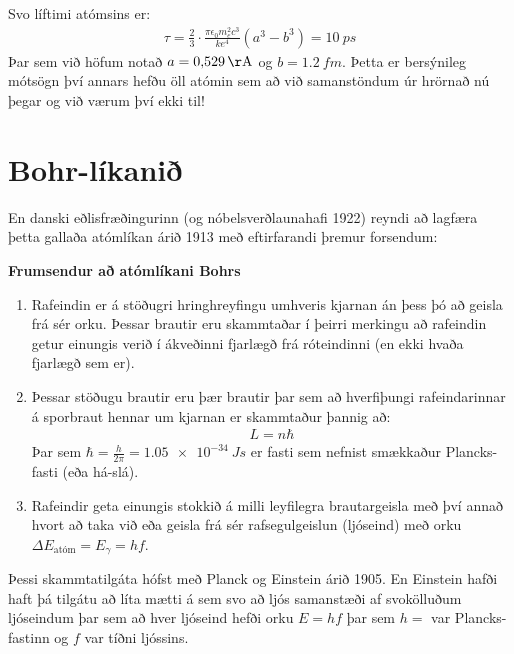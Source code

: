 Svo líftimi atómsins er:
\begin{align*}
    \tau = \frac{2}{3} \cdot \frac{\pi \epsilon_0 m_e^2 c^3}{ke^4} \left( a^3 - b^3 \right) = \SI{10}{ps}
\end{align*}
Þar sem við höfum notað $a = \SI{0.529}{\AA}$ og $b = \SI{1.2}{fm}$. Þetta er bersýnileg mótsögn því annars hefðu öll atómin sem að við samanstöndum úr hrörnað nú þegar og við værum því ekki til!

\section{Bohr-líkanið}

En danski eðlisfræðingurinn (og nóbelsverðlaunahafi 1922) reyndi að lagfæra þetta gallaða atómlíkan árið 1913 með eftirfarandi þremur forsendum:

\begin{tcolorbox}
\textbf{Frumsendur að atómlíkani Bohrs}
\begin{enumerate}[label = \textbf{(\roman*)}]
    \item Rafeindin er á stöðugri hringhreyfingu umhveris kjarnan án þess þó að geisla frá sér orku. Þessar brautir eru skammtaðar í þeirri merkingu að rafeindin getur einungis verið í ákveðinni fjarlægð frá róteindinni (en ekki hvaða fjarlægð sem er).
    
    \item Þessar stöðugu brautir eru þær brautir þar sem að hverfiþungi rafeindarinnar á sporbraut hennar um kjarnan er skammtaður þannig að:
    \begin{align*}
        L = n \hbar 
    \end{align*}
    Þar sem $\hbar = \frac{h}{2\pi} = \SI{1.05e-34}{Js}$ er fasti sem nefnist smækkaður Plancks-fasti (eða há-slá).
    
    \item Rafeindir geta einungis stokkið á milli leyfilegra brautargeisla með því annað hvort að taka við eða geisla frá sér rafsegulgeislun (ljóseind) með orku $\Delta E_{\text{atóm}} = E_\gamma = hf$.
\end{enumerate}
\end{tcolorbox}

Þessi skammtatilgáta hófst með Planck og Einstein árið 1905. En Einstein hafði haft þá tilgátu að líta mætti á sem svo að ljós samanstæði af svokölluðum ljóseindum þar sem að hver ljóseind hefði orku $E = hf$ þar sem $h = $ var Plancks-fastinn og $f$ var tíðni ljóssins.

